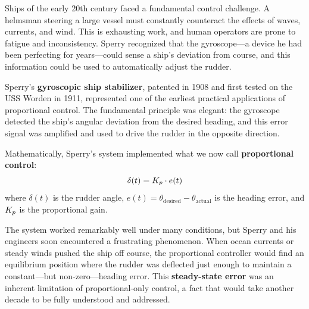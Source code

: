 Ships of the early 20th century faced a fundamental control challenge. A helmsman steering a large vessel must constantly counteract the effects of waves, currents, and wind. This is exhausting work, and human operators are prone to fatigue and inconsistency. Sperry recognized that the gyroscope---a device he had been perfecting for years---could sense a ship's deviation from course, and this information could be used to automatically adjust the rudder.

Sperry's \textbf{gyroscopic ship stabilizer}, patented in 1908 and first tested on the USS Worden in 1911, represented one of the earliest practical applications of proportional control. The fundamental principle was elegant: the gyroscope detected the ship's angular deviation from the desired heading, and this error signal was amplified and used to drive the rudder in the opposite direction.

Mathematically, Sperry's system implemented what we now call \textbf{proportional control}:
\begin{equation}
\delta(t) = K_p \cdot e(t)
\label{eq:proportional_basic}
\end{equation}
where $\delta(t)$ is the rudder angle, $e(t) = \theta_{\text{desired}} - \theta_{\text{actual}}$ is the heading error, and $K_p$ is the proportional gain.

The system worked remarkably well under many conditions, but Sperry and his engineers soon encountered a frustrating phenomenon. When ocean currents or steady winds pushed the ship off course, the proportional controller would find an equilibrium position where the rudder was deflected just enough to maintain a constant---but non-zero---heading error. This \textbf{steady-state error} was an inherent limitation of proportional-only control, a fact that would take another decade to be fully understood and addressed.

